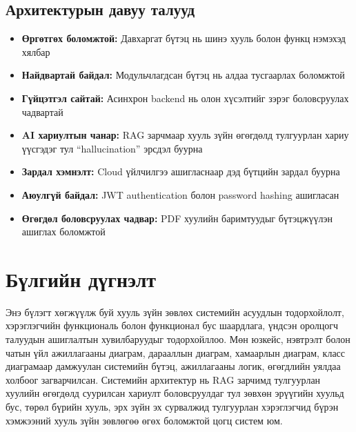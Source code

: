 
\subsection{Архитектурын давуу талууд}

\begin{itemize}
    \item \textbf{Өргөтгөх боломжтой:} Давхаргат бүтэц нь шинэ хууль болон функц нэмэхэд хялбар
    \item \textbf{Найдвартай байдал:} Модульчлагдсан бүтэц нь алдаа тусгаарлах боломжтой
    \item \textbf{Гүйцэтгэл сайтай:} Асинхрон backend нь олон хүсэлтийг зэрэг боловсруулах чадвартай
    \item \textbf{AI хариултын чанар:} RAG зарчмаар хууль зүйн өгөгдөлд тулгуурлан хариу үүсгэдэг тул ``hallucination'' эрсдэл буурна
    \item \textbf{Зардал хэмнэлт:} Cloud үйлчилгээ ашигласнаар дэд бүтцийн зардал буурна
    \item \textbf{Аюулгүй байдал:} JWT authentication болон password hashing ашигласан
    \item \textbf{Өгөгдөл боловсруулах чадвар:} PDF хуулийн баримтуудыг бүтэцжүүлэн ашиглах боломжтой
\end{itemize}


\section{Бүлгийн дүгнэлт}

Энэ бүлэгт хөгжүүлж буй хууль зүйн зөвлөх системийн асуудлын тодорхойлолт, хэрэглэгчийн функциональ болон функционал бус шаардлага, үндсэн оролцогч талуудын ашиглалтын хувилбаруудыг тодорхойллоо. Мөн юзкейс, нэвтрэлт болон чатын үйл ажиллагааны диаграм, дарааллын диаграм, хамаарлын диаграм, класс диаграмаар дамжуулан системийн бүтэц, ажиллагааны логик, өгөгдлийн уялдаа холбоог загварчилсан. Системийн архитектур нь RAG зарчимд тулгуурлан хуулийн өгөгдөлд суурилсан хариулт боловсруулдаг тул зөвхөн эрүүгийн хуульд бус, төрөл бүрийн хууль, эрх зүйн эх сурвалжид тулгуурлан хэрэглэгчид бүрэн хэмжээний хууль зүйн зөвлөгөө өгөх боломжтой цогц систем юм.